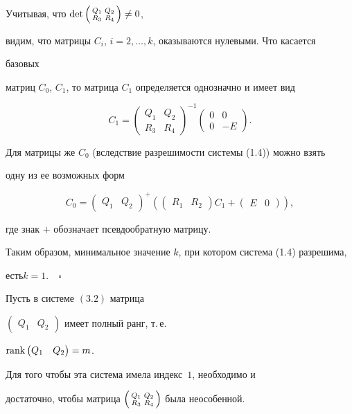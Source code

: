 Учитывая, что $\det\left(\begin{smallmatrix}Q_1 & Q_2 \\ R_3 & R_4\end{smallmatrix}\right)\ne0$, 


видим, что матрицы $C_i$, $i=2,\dotsc,k$, оказываются нулевыми. Что касается 


базовых 


матриц $C_0$, $C_1$, то матрица $C_1$ определяется однозначно и имеет вид 


$$ 


C_1=\begin{pmatrix}Q_1 & Q_2 \\R_3 & R_4 \end{pmatrix}^{-1} 


\begin{pmatrix}0 & 0 \\ 0 & -E \end{pmatrix}. 


$$ 


Для матрицы же $C_0$ (вследствие разрешимости системы (1.4)) можно взять 


одну из ее возможных форм 


$$ 


C_0=\begin{pmatrix}Q_1 & Q_2 \end{pmatrix}^+\left( 


\begin{pmatrix} R_1 & R_2 \end{pmatrix}C_1+ 


\begin{pmatrix}E & 0 \end{pmatrix}\right), 


$$ 


где знак $+$ обозначает псевдообратную матрицу. 


 


Таким образом, минимальное значение $k$, при котором система (1.4) разрешима, 


есть\linebreak $k=1$.$\quad\square$ 


 


 


\begin{thms} 


Пусть в системе $(3.2)$ матрица


$\begin{pmatrix}Q_1 & Q_2\end{pmatrix}$ имеет полный ранг, т.\,е. \linebreak


$\operatorname{rank}\begin{pmatrix}Q_1 & Q_2\end{pmatrix}=m$. 


Для того чтобы эта система имела индекс~$1$, необходимо и 


достаточно, чтобы матрица $\left(\begin{smallmatrix}Q_1 & Q_2 \\ R_3 & R_4\end{smallmatrix}\right)$ была неособенной. 


\end{thms} 


